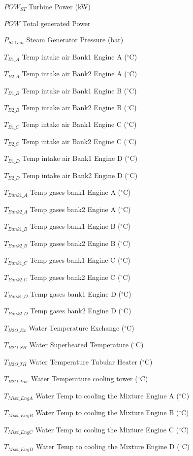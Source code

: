 \documentclass[preprint,12pt,authoryear]{elsarticle}
\begin{document}
\par $POW_{ST}$	Turbine Power (kW)
\par $POW$		Total generated Power
\par $P_{St\_Gen}$	Steam Generator Pressure (bar)
\par $T_{B1\_A}$	Temp intake air Bank1 Engine A ($^{\circ}$C) 
\par $T_{B2\_A}$	Temp intake air Bank2 Engine A ($^{\circ}$C) 
\par $T_{B1\_B}$	Temp intake air Bank1 Engine B ($^{\circ}$C) 
\par $T_{B2\_B}$	Temp intake air Bank2 Engine B ($^{\circ}$C) 
\par $T_{B1\_C}$	Temp intake air Bank1 Engine C ($^{\circ}$C) 
\par $T_{B2\_C}$	Temp intake air Bank2 Engine C ($^{\circ}$C) 
\par $T_{B1\_D}$	Temp intake air Bank1 Engine D ($^{\circ}$C) 
\par $T_{B2\_D}$	Temp intake air Bank2 Engine D ($^{\circ}$C) 
\par $T_{Bank1\_A}$	Temp gases bank1 Engine A ($^{\circ}$C) 
\par $T_{Bank2\_A}$	Temp gases bank2 Engine A ($^{\circ}$C) 
\par $T_{Bank1\_B}$	Temp gases bank1 Engine B ($^{\circ}$C) 
\par $T_{Bank2\_B}$	Temp gases bank2 Engine B ($^{\circ}$C) 
\par $T_{Bank1\_C}$	Temp gases bank1 Engine C ($^{\circ}$C) 
\par $T_{Bank2\_C}$	Temp gases bank2 Engine C ($^{\circ}$C) 
\par $T_{Bank1\_D}$	Temp gases bank1 Engine D ($^{\circ}$C) 
\par $T_{Bank2\_D}$	Temp gases bank2 Engine D ($^{\circ}$C) 
\par $T_{H2O\_Ex}$	Water Temperature Exchange ($^{\circ}$C) 
\par $T_{H2O\_SH}$	Water Superheated Temperature ($^{\circ}$C) 
\par $T_{H2O\_TH}$	Water Temperature Tubular Heater ($^{\circ}$C) 
\par $T_{H2O\_Tow}$	Water Temperature cooling tower ($^{\circ}$C) 
\par $T_{Mixt\_EngA}$	Water Temp to cooling the Mixture Engine A ($^{\circ}$C) 
\par $T_{Mixt\_EngB}$	Water Temp to cooling the Mixture Engine B ($^{\circ}$C)  
\par $T_{Mixt\_EngC}$	Water Temp to cooling the Mixture Engine C ($^{\circ}$C)  
\par $T_{Mixt\_EngD}$	Water Temp to cooling the Mixture Engine D ($^{\circ}$C)

\FloatBarrier
 



\end{document}
